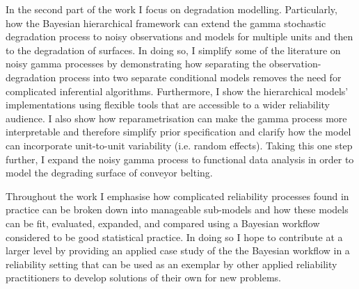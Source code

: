 In the second part of the work I focus on degradation modelling. Particularly, how the Bayesian hierarchical framework can extend the gamma stochastic degradation process to noisy observations and models for multiple units and then to the degradation of surfaces. In doing so, I simplify some of the literature on noisy gamma processes by demonstrating how separating the observation-degradation process into two separate conditional models removes the need for complicated inferential algorithms. Furthermore, I show the hierarchical models' implementations using flexible tools that are accessible to a wider reliability audience. I also show how reparametrisation can make the gamma process more interpretable and therefore simplify prior specification and clarify how the model can incorporate unit-to-unit variability (i.e. random effects). Taking this one step further, I expand the noisy gamma process to functional data analysis in order to model the degrading surface of conveyor belting.

Throughout the work I emphasise how complicated reliability processes found in practice can be broken down into manageable sub-models and how these models can be fit, evaluated, expanded, and compared using a Bayesian workflow considered to be good statistical practice. In doing so I hope to contribute at a larger level by providing an applied case study of the the Bayesian workflow in a reliability setting that can be used as an exemplar by other applied reliability practitioners to develop solutions of their own for new problems.

\vspace*{\fill}
